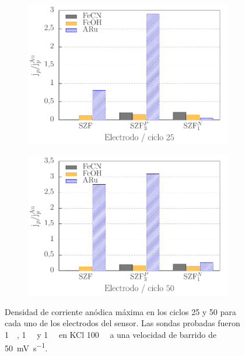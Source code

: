 {			\begin{figure}[h!]
		 	\begin{subfigure}[t]{0.495\textwidth}
		 	 \includegraphics[width=\textwidth]{Graficos/histogramas-ciclo25.pdf}
		 	  \end{subfigure}
			\begin{subfigure}[t]{0.495\textwidth}
		 	   \includegraphics[width=\textwidth]{Graficos/histogramas-ciclo50.pdf}
		 	   \end{subfigure}
		      	\caption[Corriente de pico en distintos ciclos voltamperometricos]{Densidad de corriente anódica máxima en los ciclos 25 y 50 para cada uno de los electrodos del sensor. Las sondas probadas fueron \fc \SI{1}{\milli\Molar}, \fe\space \SI{1}{\milli\Molar} y \ru\space \SI{1}{\milli\Molar} en KCl \SI{100}{\milli\Molar} a una velocidad de barrido de \SI{50}{\milli\volt\per\second}.}
		      	\label{fig:barras}
		      	\end{figure}

}
